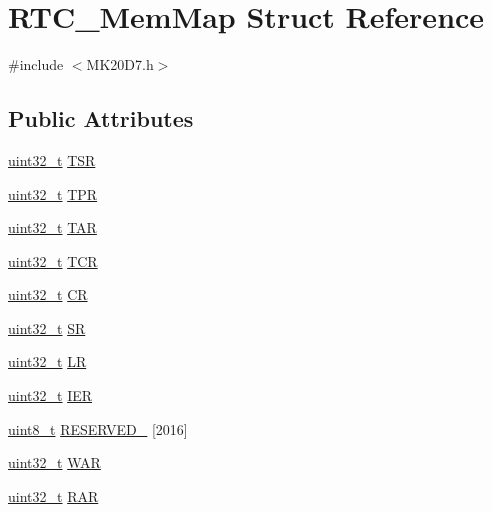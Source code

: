 \hypertarget{struct_r_t_c___mem_map}{}\section{R\+T\+C\+\_\+\+Mem\+Map Struct Reference}
\label{struct_r_t_c___mem_map}


{\ttfamily \#include $<$M\+K20\+D7.\+h$>$}

\subsection*{Public Attributes}
\begin{DoxyCompactItemize}
\item 
\hyperlink{_p_e___types_8h_a33594304e786b158f3fb30289278f5af}{uint32\+\_\+t} \hyperlink{struct_r_t_c___mem_map_a4ca4d2878d99736cbff0e8b107a275f2}{T\+SR}
\item 
\hyperlink{_p_e___types_8h_a33594304e786b158f3fb30289278f5af}{uint32\+\_\+t} \hyperlink{struct_r_t_c___mem_map_a32641b62d548255bdf2164b457a2aaeb}{T\+PR}
\item 
\hyperlink{_p_e___types_8h_a33594304e786b158f3fb30289278f5af}{uint32\+\_\+t} \hyperlink{struct_r_t_c___mem_map_a500ab794376810b97e2b2e01658f330c}{T\+AR}
\item 
\hyperlink{_p_e___types_8h_a33594304e786b158f3fb30289278f5af}{uint32\+\_\+t} \hyperlink{struct_r_t_c___mem_map_ab816b0540497796070202cd2f5bc10ed}{T\+CR}
\item 
\hyperlink{_p_e___types_8h_a33594304e786b158f3fb30289278f5af}{uint32\+\_\+t} \hyperlink{struct_r_t_c___mem_map_a05c71be888cd40a4d91c631260d684d7}{CR}
\item 
\hyperlink{_p_e___types_8h_a33594304e786b158f3fb30289278f5af}{uint32\+\_\+t} \hyperlink{struct_r_t_c___mem_map_a82faed2f609de35e3b27d5fd27ba82e2}{SR}
\item 
\hyperlink{_p_e___types_8h_a33594304e786b158f3fb30289278f5af}{uint32\+\_\+t} \hyperlink{struct_r_t_c___mem_map_a6d1b4fe68ed53926b57392e7ad582469}{LR}
\item 
\hyperlink{_p_e___types_8h_a33594304e786b158f3fb30289278f5af}{uint32\+\_\+t} \hyperlink{struct_r_t_c___mem_map_a1db69b589f5bfc5faa12b9c54e7c8061}{I\+ER}
\item 
\hyperlink{_p_e___types_8h_aba7bc1797add20fe3efdf37ced1182c5}{uint8\+\_\+t} \hyperlink{struct_r_t_c___mem_map_a26ffeb9960ce866c1ad43ded6153d778}{R\+E\+S\+E\+R\+V\+E\+D\+\_} \mbox{[}2016\mbox{]}
\item 
\hyperlink{_p_e___types_8h_a33594304e786b158f3fb30289278f5af}{uint32\+\_\+t} \hyperlink{struct_r_t_c___mem_map_aa3d2abe1fdd440a05339c38d377a2ee6}{W\+AR}
\item 
\hyperlink{_p_e___types_8h_a33594304e786b158f3fb30289278f5af}{uint32\+\_\+t} \hyperlink{struct_r_t_c___mem_map_a59094243dc3c0849c9bc20a2a809086c}{R\+AR}
\end{DoxyCompactItemize}


